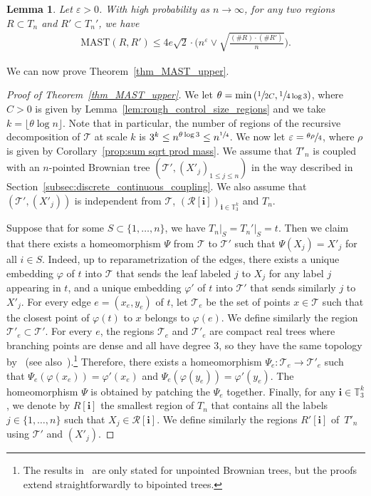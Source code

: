\documentclass[11pt]{article}
\newcommand{\Tt}{\mathcal{T}}
\newcommand{\Rr}{\mathcal{R}}
\newcommand{\ii}{\mathbf{i}}
\let\eps\varepsilon
\theoremstyle{plain}
\newtheorem{lemma}[theorem]{Lemma}
\theoremstyle{definition}
\numberwithin{equation}{section}
\begin{document}
\begin{lemma}\label{lem:bound mast of two regions}
Let $\eps>0$. With high probability as $n\rightarrow \infty$, for any two regions $R\subset T_n$ and $R'\subset T_n'$, we have\vspace*{-3pt}
\begin{align}\label{eqn_general_sqrt_bound}
\mathrm{MAST}(R,R') \leq 4e\sqrt{2} \cdot \biggl( n^\eps \vee \sqrt{\frac{(\#R)\cdot (\#R')}{n}} \biggr).
\end{align}
\end{lemma}

We can now prove Theorem~\ref{thm_MAST_upper}.
\begin{proof}[Proof of Theorem~\ref{thm_MAST_upper}]
We let $\theta= \min \left( \sfrac{1}{2C}, \sfrac{1}{4 \log 3} \right)$, where $C>0$ is given by Lemma~\ref{lem:rough_control_size_regions} and we take $k=\lfloor \theta \log n \rfloor$. Note that in particular, the number of regions of the recursive decomposition of $\Tt$ at scale $k$ is $3^k\leq n^{\theta \log 3} \leq n^{\sfrac{1}{4}}$.
We now let $\eps =\sfrac{\theta \rho}{4}$, where $\rho$ is given by Corollary~\ref{prop:sum sqrt prod mass}. We assume that $T'_n$ is coupled with an $n$-pointed Brownian tree $\left( \Tt', (X'_j)_{1 \leq j \leq n} \right)$ in the way described in Section~\ref{subsec:discrete_continuous_coupling}.
We also assume that $\left(\Tt', (X'_j) \right)$ is independent from $\Tt$, $\left( \Rr[\ii] \right)_{\ii \in \mathbb{T}_3^k}$ and $T_n$.

Suppose that for some $S\subset \{1,\dots, n\}$, we have $T_n\vert_S=T_n'\vert_S=t$. Then we claim that there exists a homeomorphism $\Psi$ from $\Tt$ to $\Tt'$ such that $\Psi(X_j)=X'_j$ for all $i \in S$.
Indeed, up to reparametrization of the edges, there exists a unique embedding $\varphi$ of $t$ into $\Tt$ that sends the leaf labeled $j$ to $X_j$ for any label $j$ appearing in $t$, and a unique embedding $\varphi'$ of $t$ into $\Tt'$ that sends similarly $j$ to $X'_j$. For every edge $e=(x_e,y_e)$ of $t$, let $\mathcal{T}_e$ be the set of points $x \in \mathcal{T}$ such that the closest point of $\varphi(t)$ to $x$ belongs to $\varphi(e)$.
We define similarly the region $\mathcal{T}'_e \subset \Tt'$.
For every $e$, the regions $\mathcal{T}_e$ and $\mathcal{T}'_e$ are compact real trees where branching points are dense and all have degree $3$, so they have the same topology by~\cite[Th.\,1]{BT21} (see also~\cite{CH08}).\footnote{The results in~\cite{BT21} are only stated for unpointed Brownian trees, but the proofs extend straightforwardly to bipointed trees.}
Therefore, there exists a homeomorphism $\Psi_e : \mathcal{T}_e \to \mathcal{T}'_e$ such that $\Psi_e \left( \varphi(x_e) \right)=\varphi'(x_e)$ and $\Psi_e \left( \varphi(y_e) \right)=\varphi'(y_e)$.
The homeomorphism $\Psi$ is obtained by patching the $\Psi_e$ together.
Finally, for any $\ii \in \mathbb{T}_3^k$, we denote by $R[\ii]$ the smallest region of $T_n$ that contains all the labels $j \in \{1,\dots,n\}$ such that $X_j \in \Rr[\ii]$.
We define similarly the regions $R'[\ii]$ of~$T'_n$ using $\Tt'$ and $(X'_j)$.


\end{proof}
\end{document}

